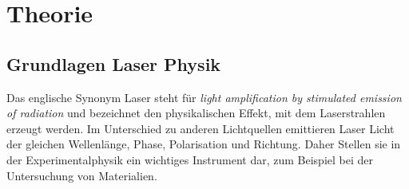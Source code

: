 \section{Theorie}
\label{sec:Theorie}

\subsection{Grundlagen Laser Physik}
\label{sec:Grundlagen}
Das englische Synonym Laser steht für \textit{light amplification by stimulated emission of radiation}
und bezeichnet den physikalischen Effekt, mit dem  Laserstrahlen erzeugt werden.
Im Unterschied zu anderen Lichtquellen emittieren Laser Licht der gleichen Wellenlänge, Phase, Polarisation und Richtung. 
Daher Stellen sie in der Experimentalphysik ein wichtiges Instrument dar,
zum Beispiel bei der Untersuchung von Materialien.

